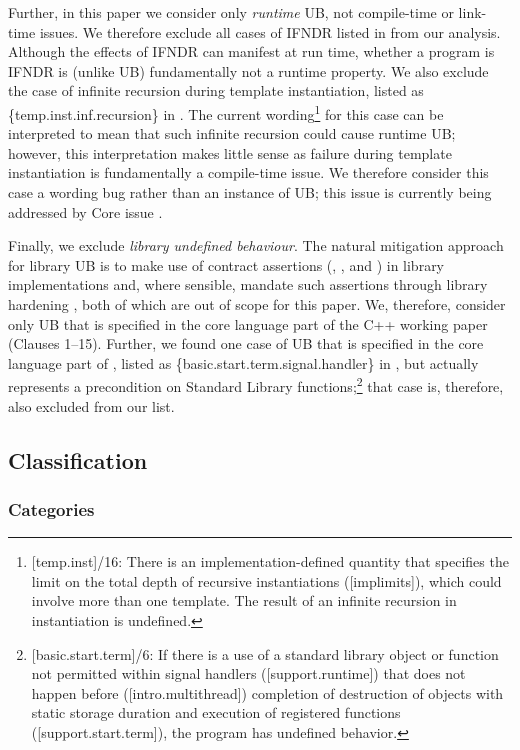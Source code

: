 Further, in this paper we consider only \emph{runtime} UB, not compile-time or link-time issues. We therefore exclude all cases of IFNDR listed in \cite{P3596R1} from our analysis. Although the effects of IFNDR can manifest at run time, whether a program is IFNDR is (unlike UB) fundamentally not a runtime property. We also exclude the case of infinite recursion during template instantiation, listed as \{temp.inst.inf.recursion\} in \cite{P3596R1}. The current wording\footnote{[temp.inst]/16: There is an implementation-defined quantity that specifies the limit on the total depth of recursive instantiations ([implimits]), which could involve more than one template. The result of an infinite recursion in instantiation is undefined.} for this case can be interpreted to mean that such infinite recursion could cause runtime UB; however, this interpretation makes little sense as failure during template instantiation is fundamentally a compile-time issue. We therefore consider this case a wording bug rather than an instance of UB; this issue is currently being addressed by Core issue \cite{CWG3034}.

Finally, we exclude \emph{library undefined behaviour}. The natural mitigation approach for library UB is to make use of contract assertions (, , and ) in library implementations and, where sensible, mandate such assertions through library hardening \cite{P3471R4}, both of which are out of scope for this paper. We, therefore, consider only UB that is specified in the core language part of the C++ working paper (Clauses 1--15). Further, we found one case of UB that is specified in the core language part of \cite{N5008}, listed as \{basic.start.term.signal.handler\} in \cite{P3596R1}, but actually represents a precondition on Standard Library functions;\footnote{[basic.start.term]/6: If there is a use of a standard library object or function not permitted within signal handlers ([support.runtime]) that does not happen before ([intro.multithread]) completion of destruction of objects with static storage duration and execution of  registered functions ([support.start.term]), the program has undefined behavior.}
that case is, therefore, also excluded from our list.


\subsection{Classification}


\subsubsection{Categories}
\label{categories}

